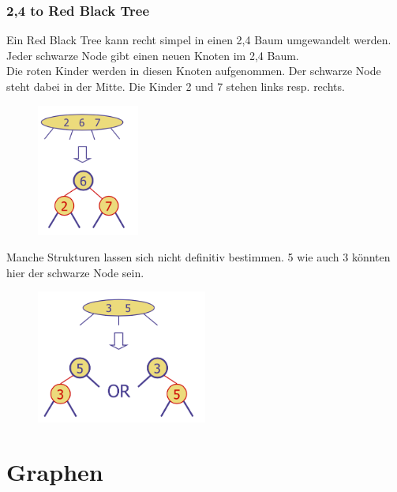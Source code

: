 \documentclass[a4paper,10pt]{report}
\begin{document}
\subsubsection{2,4 to Red Black Tree}
Ein Red Black Tree kann recht simpel in einen 2,4 Baum umgewandelt werden.\\
Jeder schwarze Node gibt einen neuen Knoten im 2,4 Baum.\\
Die roten Kinder werden in diesen Knoten aufgenommen.
Der schwarze Node steht dabei in der Mitte. Die Kinder 2 und 7 stehen links resp. rechts.
\begin{figure}[H]
	\begin{center}
  		\includegraphics[width=0.3\textwidth]{img/24newNode.png}
	\end{center}
\end{figure}
\noindent
Manche Strukturen lassen sich nicht definitiv bestimmen. 5 wie auch 3 könnten hier der schwarze Node sein.
\begin{figure}[H]
	\begin{center}
  		\includegraphics[width=0.5\textwidth]{img/24or.png}
	\end{center}
\end{figure}
\newpage
\section{Graphen}
\end{document}
